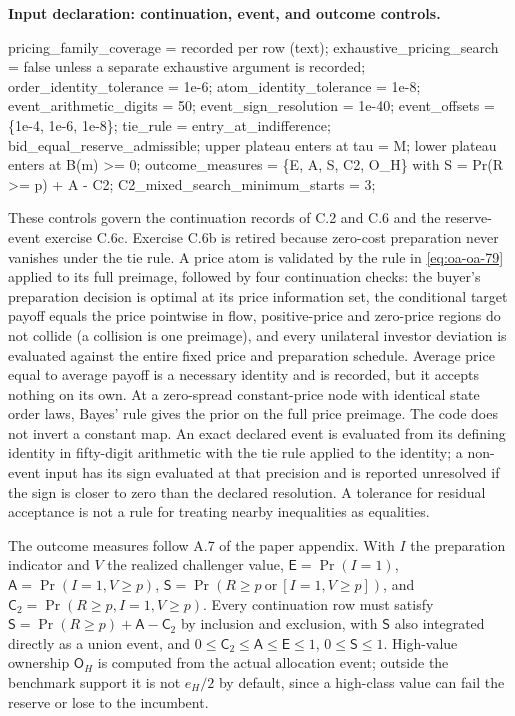 \documentclass[
  11pt,
]{article}
\newenvironment{Shaded}{}{}
\newcommand{\NormalTok}[1]{#1}
\begin{document}

\textbf{Input declaration: continuation, event, and outcome controls.}

\begin{Shaded}
\begin{Highlighting}[]
\NormalTok{pricing\_family\_coverage = recorded per row (text);}
\NormalTok{exhaustive\_pricing\_search = false unless a separate exhaustive argument is recorded;}
\NormalTok{order\_identity\_tolerance = 1e{-}6;}
\NormalTok{atom\_identity\_tolerance = 1e{-}8;}
\NormalTok{event\_arithmetic\_digits = 50;}
\NormalTok{event\_sign\_resolution = 1e{-}40;}
\NormalTok{event\_offsets = \{1e{-}4, 1e{-}6, 1e{-}8\};}
\NormalTok{tie\_rule = entry\_at\_indifference; bid\_equal\_reserve\_admissible;}
\NormalTok{           upper plateau enters at tau = M; lower plateau enters at B(m) \textgreater{}= 0;}
\NormalTok{outcome\_measures = \{E, A, S, C2, O\_H\} with S = Pr(R \textgreater{}= p) + A {-} C2;}
\NormalTok{C2\_mixed\_search\_minimum\_starts = 3;}
\end{Highlighting}
\end{Shaded}

These controls govern the continuation records of C.2 and C.6 and the
reserve-event exercise C.6c. Exercise C.6b is retired because zero-cost
preparation never vanishes under the tie rule. A price atom is validated
by the rule in \eqref{eq:oa-oa-79} applied to its full preimage,
followed by four continuation checks: the buyer's preparation decision
is optimal at its price information set, the conditional target payoff
equals the price pointwise in flow, positive-price and zero-price
regions do not collide (a collision is one preimage), and every
unilateral investor deviation is evaluated against the entire fixed
price and preparation schedule. Average price equal to average payoff is
a necessary identity and is recorded, but it accepts nothing on its own.
At a zero-spread constant-price node with identical state order laws,
Bayes' rule gives the prior on the full price preimage. The code does
not invert a constant map. An exact declared event is evaluated from its
defining identity in fifty-digit arithmetic with the tie rule applied to
the identity; a non-event input has its sign evaluated at that precision
and is reported unresolved if the sign is closer to zero than the
declared resolution. A tolerance for residual acceptance is not a rule
for treating nearby inequalities as equalities.

The outcome measures follow A.7 of the paper appendix. With \(I\) the
preparation indicator and \(V\) the realized challenger value,
\(\mathsf E=\Pr(I=1)\), \(\mathsf A=\Pr(I=1,V\ge p)\),
\(\mathsf S=\Pr(R\ge p\ \text{or}\ [I=1,V\ge p])\), and
\(\mathsf C_2=\Pr(R\ge p,I=1,V\ge p)\). Every continuation row must
satisfy \(\mathsf S=\Pr(R\ge p)+\mathsf A-\mathsf C_2\) by inclusion and
exclusion, with \(\mathsf S\) also integrated directly as a union event,
and \(0\le\mathsf C_2\le\mathsf A\le\mathsf E\le1\),
\(0\le\mathsf S\le1\). High-value ownership \(\mathsf O_H\) is computed
from the actual allocation event; outside the benchmark support it is
not \(e_H/2\) by default, since a high-class value can fail the reserve
or lose to the incumbent.
\end{document}

